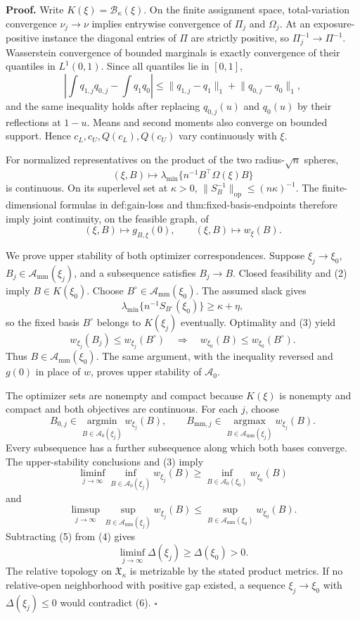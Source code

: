 \textbf{Proof.}
Write \(K(\xi)=\mathcal B_\kappa(\xi)\). On the finite assignment space, total-variation convergence \(\nu_j\to\nu\) implies entrywise convergence of \(\Pi_j\) and \(\Omega_j\). At an exposure-positive instance the diagonal entries of \(\Pi\) are strictly positive, so \(\Pi_j^{-1}\to\Pi^{-1}\). Wasserstein convergence of bounded marginals is exactly convergence of their quantiles in \(L^1(0,1)\). Since all quantiles lie in \([0,1]\),
\[
\left|\int q_{1,j}q_{0,j}-\int q_1q_0\right|
\le\lVert q_{1,j}-q_1\rVert_1+\lVert q_{0,j}-q_0\rVert_1, \tag{1}
\]
and the same inequality holds after replacing \(q_{0,j}(u)\) and \(q_0(u)\) by their reflections at \(1-u\). Means and second moments also converge on bounded support. Hence \(c_L,c_U,Q(c_L),Q(c_U)\) vary continuously with \(\xi\).

For normalized representatives on the product of the two radius-\(\sqrt n\) spheres,
\[
(\xi,B)\longmapsto\lambda_{\min}\{n^{-1}B^{\top}\Omega(\xi)B\} \tag{2}
\]
is continuous. On its superlevel set at \(\kappa>0\), \(\lVert S_B^{-1}\rVert_{\mathrm{op}}\le(n\kappa)^{-1}\). The finite-dimensional formulas in def:gain-loss and thm:fixed-basis-endpoints therefore imply joint continuity, on the feasible graph, of
\[
(\xi,B)\longmapsto g_{B,\xi}(0),
\qquad
(\xi,B)\longmapsto w_\xi(B). \tag{3}
\]

We prove upper stability of both optimizer correspondences. Suppose \(\xi_j\to\xi_0\), \(B_j\in\mathcal A_{\mathrm{mm}}(\xi_j)\), and a subsequence satisfies \(B_j\to B\). Closed feasibility and (2) imply \(B\in K(\xi_0)\). Choose \(B^\circ\in\mathcal A_{\mathrm{mm}}(\xi_0)\). The assumed slack gives
\[
\lambda_{\min}\{n^{-1}S_{B^\circ}(\xi_0)\}\ge\kappa+\eta,
\]
so the fixed basis \(B^\circ\) belongs to \(K(\xi_j)\) eventually. Optimality and (3) yield
\[
w_{\xi_j}(B_j)\le w_{\xi_j}(B^\circ)
\quad\Longrightarrow\quad
w_{\xi_0}(B)\le w_{\xi_0}(B^\circ).
\]
Thus \(B\in\mathcal A_{\mathrm{mm}}(\xi_0)\). The same argument, with the inequality reversed and \(g(0)\) in place of \(w\), proves upper stability of \(\mathcal A_0\).

The optimizer sets are nonempty and compact because \(K(\xi)\) is nonempty and compact and both objectives are continuous. For each \(j\), choose
\[
B_{0,j}\in\operatorname*{argmin}_{B\in\mathcal A_0(\xi_j)}w_{\xi_j}(B),
\qquad
B_{\mathrm{mm},j}\in\operatorname*{argmax}_{B\in\mathcal A_{\mathrm{mm}}(\xi_j)}w_{\xi_j}(B).
\]
Every subsequence has a further subsequence along which both bases converge. The upper-stability conclusions and (3) imply
\[
\liminf_{j\to\infty}\inf_{B\in\mathcal A_0(\xi_j)}w_{\xi_j}(B)
\ge\inf_{B\in\mathcal A_0(\xi_0)}w_{\xi_0}(B) \tag{4}
\]
and
\[
\limsup_{j\to\infty}\sup_{B\in\mathcal A_{\mathrm{mm}}(\xi_j)}w_{\xi_j}(B)
\le\sup_{B\in\mathcal A_{\mathrm{mm}}(\xi_0)}w_{\xi_0}(B). \tag{5}
\]
Subtracting (5) from (4) gives
\[
\liminf_{j\to\infty}\Delta(\xi_j)\ge\Delta(\xi_0)>0. \tag{6}
\]
The relative topology on \(\mathfrak X_\kappa\) is metrizable by the stated product metrics. If no relative-open neighborhood with positive gap existed, a sequence \(\xi_j\to\xi_0\) with \(\Delta(\xi_j)\le0\) would contradict (6). \(\square\)